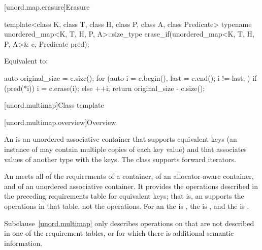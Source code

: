 [unord.map.erasure]{Erasure}

%
\begin{itemdecl}
template<class K, class T, class H, class P, class A, class Predicate>
  typename unordered_map<K, T, H, P, A>::size_type
    erase_if(unordered_map<K, T, H, P, A>& c, Predicate pred);
\end{itemdecl}

\begin{itemdescr}
\pnum
\effects
Equivalent to:
\begin{codeblock}
auto original_size = c.size();
for (auto i = c.begin(), last = c.end(); i != last; ) {
  if (pred(*i)) {
    i = c.erase(i);
  } else {
    ++i;
  }
}
return original_size - c.size();
\end{codeblock}
\end{itemdescr}

[unord.multimap]{Class template }%

[unord.multimap.overview]{Overview}

\pnum
{}%
%
An  is an unordered associative container
that supports equivalent keys (an instance of  may contain
multiple copies of each key value) and that associates values of
another type  with the keys.
The  class
supports forward iterators.

\pnum
An  meets all of the requirements
of a container,
of an allocator-aware container, and
of an unordered associative container.
It provides the operations described in the
preceding requirements table for equivalent keys; that is, an 
supports the  operations in that table, not the  operations.
For an  the  is ,
the  is ,
and the  is .

\pnum
Subclause~\ref{unord.multimap} only describes operations on 
that are not described in one of the requirement tables, or for which
there is additional semantic information.

